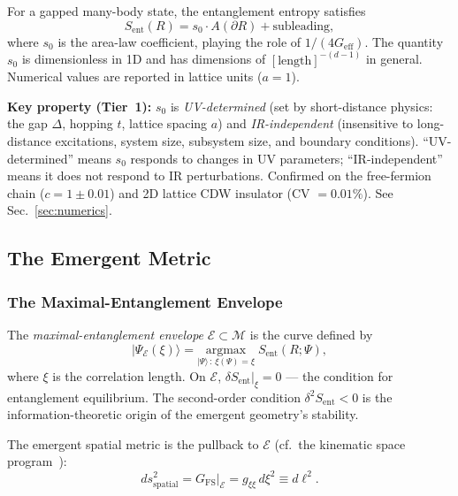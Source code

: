 \documentclass[aps,prd,twocolumn,superscriptaddress,nofootinbib,floatfix]{revtex4-2}
\newcommand{\sn}{s_0}
\newcommand{\Geff}{G_{\mathrm{eff}}}
\newcommand{\Sent}{S_{\mathrm{ent}}}
\begin{document}
For a gapped many-body state, the entanglement entropy satisfies~\cite{Hastings2007,EisertCramerPlenio2010}
\begin{equation}
\label{eq:arealaw}
\Sent(R) = \sn \cdot A(\partial R) + \text{subleading},
\end{equation}
where $\sn$ is the area-law coefficient, playing the role of $1/(4\Geff)$. The quantity $\sn$ is dimensionless in 1D and has dimensions of $[\text{length}]^{-(d-1)}$ in general. Numerical values are reported in lattice units ($a = 1$).

\textbf{Key property (Tier~1):} $\sn$ is \emph{UV-determined} (set by short-distance physics: the gap $\Delta$, hopping $t$, lattice spacing $a$) and \emph{IR-independent} (insensitive to long-distance excitations, system size, subsystem size, and boundary conditions). ``UV-determined'' means $\sn$ responds to changes in UV parameters; ``IR-independent'' means it does not respond to IR perturbations. Confirmed on the free-fermion chain ($c = 1 \pm 0.01$) and 2D lattice CDW insulator (CV $= 0.01\%$). See Sec.~\ref{sec:numerics}.

\subsection{The Emergent Metric}
\label{sec:emergent_metric}

\subsubsection{The Maximal-Entanglement Envelope}

The \emph{maximal-entanglement envelope} $\mathcal{E} \subset \mathcal{M}$ is the curve defined by
\begin{equation}
|\Psi_{\mathcal{E}}(\xi)\rangle = \underset{|\Psi\rangle\,:\,\xi(\Psi)=\xi}{\mathrm{argmax}}\; \Sent(R;\Psi),
\end{equation}
where $\xi$ is the correlation length. On $\mathcal{E}$, $\delta\Sent|_\xi = 0$ --- the condition for entanglement equilibrium. The second-order condition $\delta^2\Sent < 0$ is the information-theoretic origin of the emergent geometry's stability.

The emergent spatial metric is the pullback to $\mathcal{E}$ (cf.\ the kinematic space program~\cite{Czech2016,NozakiRyuTakayanagi2012}):
\begin{equation}
ds^2_{\mathrm{spatial}} = G_{\mathrm{FS}}\big|_{\mathcal{E}} = g_{\xi\xi}\,d\xi^2 \equiv d\ell^2.
\end{equation}
\end{document}
